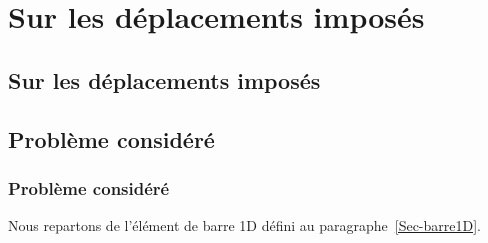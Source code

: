\ifVersionAvecExemplesSepares
  \chapter{Sur les déplacements imposés}\label{Ch-DispLag}%
\else
  \section{Sur les déplacements imposés}\label{Ch-DispLag}%
\fi

\medskip
\ifVersionAvecExemplesSepares
  \section{Problème considéré}
\else
  \subsection{Problème considéré}
\fi

Nous repartons de l'élément de barre 1D défini au paragraphe~\ref{Sec-barre1D}.

